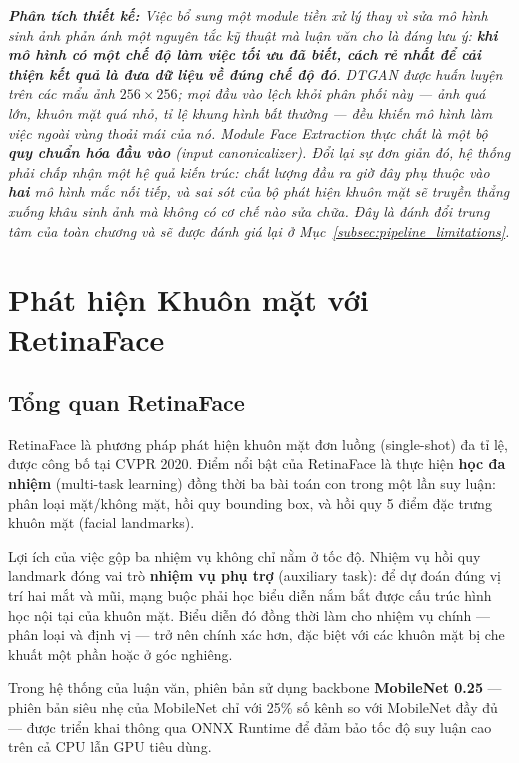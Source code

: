 \medskip
\noindent\textit{\textbf{Phân tích thiết kế:} Việc bổ sung một module tiền xử lý thay vì sửa mô hình sinh ảnh phản ánh một nguyên tắc kỹ thuật mà luận văn cho là đáng lưu ý: \textbf{khi mô hình có một chế độ làm việc tối ưu đã biết, cách rẻ nhất để cải thiện kết quả là đưa dữ liệu về đúng chế độ đó}. DTGAN được huấn luyện trên các mẩu ảnh $256\times256$; mọi đầu vào lệch khỏi phân phối này --- ảnh quá lớn, khuôn mặt quá nhỏ, tỉ lệ khung hình bất thường --- đều khiến mô hình làm việc ngoài vùng thoải mái của nó. Module Face Extraction thực chất là một bộ \textbf{quy chuẩn hóa đầu vào} (input canonicalizer). Đổi lại sự đơn giản đó, hệ thống phải chấp nhận một hệ quả kiến trúc: chất lượng đầu ra giờ đây phụ thuộc vào \textbf{hai} mô hình mắc nối tiếp, và sai sót của bộ phát hiện khuôn mặt sẽ truyền thẳng xuống khâu sinh ảnh mà không có cơ chế nào sửa chữa. Đây là đánh đổi trung tâm của toàn chương và sẽ được đánh giá lại ở Mục~\ref{subsec:pipeline_limitations}.}

\section{Phát hiện Khuôn mặt với RetinaFace}
\label{sec:retinaface}

\subsection{Tổng quan RetinaFace}
\label{subsec:chap3_retinaface_overview}

RetinaFace \cite{Deng2019RetinaFace} là phương pháp phát hiện khuôn mặt đơn luồng (single-shot) đa tỉ lệ, được công bố tại CVPR 2020. Điểm nổi bật của RetinaFace là thực hiện \textbf{học đa nhiệm} (multi-task learning) đồng thời ba bài toán con trong một lần suy luận: phân loại mặt/không mặt, hồi quy bounding box, và hồi quy 5 điểm đặc trưng khuôn mặt (facial landmarks).

Lợi ích của việc gộp ba nhiệm vụ không chỉ nằm ở tốc độ. Nhiệm vụ hồi quy landmark đóng vai trò \textbf{nhiệm vụ phụ trợ} (auxiliary task): để dự đoán đúng vị trí hai mắt và mũi, mạng buộc phải học biểu diễn nắm bắt được cấu trúc hình học nội tại của khuôn mặt. Biểu diễn đó đồng thời làm cho nhiệm vụ chính --- phân loại và định vị --- trở nên chính xác hơn, đặc biệt với các khuôn mặt bị che khuất một phần hoặc ở góc nghiêng.

Trong hệ thống của luận văn, phiên bản sử dụng backbone \textbf{MobileNet 0.25} \cite{Howard2017MobileNet} --- phiên bản siêu nhẹ của MobileNet chỉ với 25\% số kênh so với MobileNet đầy đủ --- được triển khai thông qua ONNX Runtime \cite{ONNX2019} để đảm bảo tốc độ suy luận cao trên cả CPU lẫn GPU tiêu dùng.

